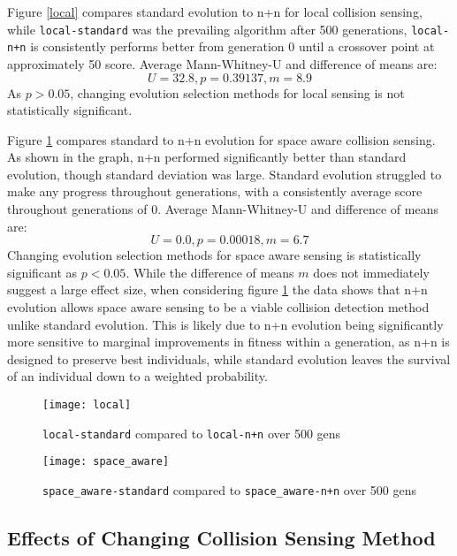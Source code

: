 Figure \ref{local} compares standard evolution to n+n for local collision sensing, while \verb|local-standard| was the prevailing algorithm after 500 generations, \verb|local-n+n| is consistently performs better from generation 0 until a crossover point at approximately 50 score. Average Mann-Whitney-U and difference of means are:
$$
U = 32.8, p = 0.39137, m = 8.9
$$
As $p > 0.05$, changing evolution selection methods for local sensing is not statistically significant.
\bigskip

Figure \ref{space_aware} compares standard to n+n evolution for space aware collision sensing. As shown in the graph, n+n performed significantly better than standard evolution, though standard deviation was large. Standard evolution struggled to make any progress throughout generations, with a consistently average score throughout generations of 0. Average Mann-Whitney-U and difference of means are:
$$
U = 0.0, p = 0.00018, m = 6.7
$$
Changing evolution selection methods for space aware sensing is statistically significant as $p < 0.05$. While the difference of means $m$ does not immediately suggest a large effect size, when considering figure \ref{space_aware} the data shows that n+n evolution allows space aware sensing to be a viable collision detection method unlike standard evolution. This is likely due to n+n evolution being significantly more sensitive to marginal improvements in fitness within a generation, as n+n is designed to preserve best individuals, while standard evolution leaves the survival of an individual down to a weighted probability.

\begin{figure}[h]
  \centering
  \begin{minipage}{.5\textwidth}
    \centering
    \captionsetup{width=.8\linewidth}
    \texttt{[image: local]}
    \caption{\texttt{local-standard} compared to \texttt{local-n+n} over 500 gens}
    \label{local}
  \end{minipage}%
  \begin{minipage}{.5\textwidth}
    \centering
    \captionsetup{width=.8\linewidth}
    \texttt{[image: space\_aware]}
    \caption{\texttt{space\_aware-standard} compared to \texttt{space\_aware-n+n} over 500 gens}
    \label{space_aware}
  \end{minipage}
\end{figure}


\subsection{Effects of Changing Collision Sensing Method}


